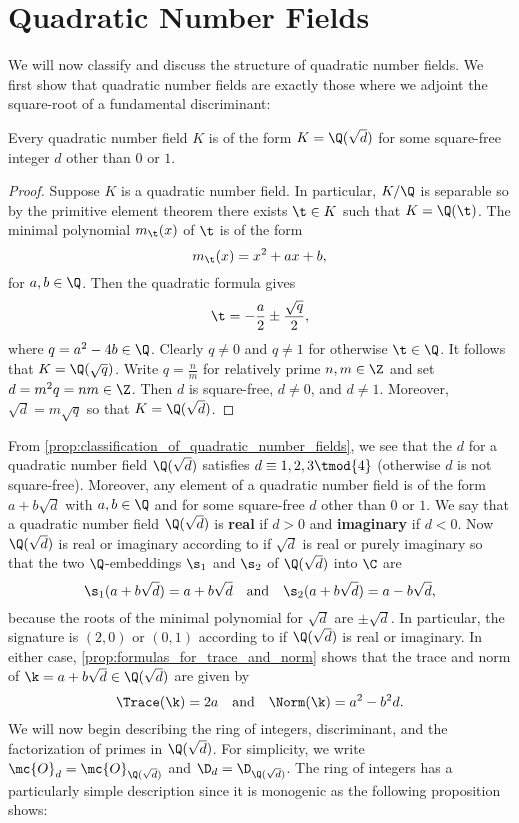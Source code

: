   \section{Quadratic Number Fields}
    We will now classify and discuss the structure of quadratic number fields. We first show that quadratic number fields are exactly those where we adjoint the square-root of a fundamental discriminant:

    \begin{proposition}\label{prop:classification_of_quadratic_number_fields}
      Every quadratic number field $K$ is of the form $K = \Q(\sqrt{d})$ for some square-free integer $d$ other than $0$ or $1$.
    \end{proposition}
    \begin{proof}
      Suppose $K$ is a quadratic number field. In particular, $K/\Q$ is separable so by the primitive element theorem there exists $\t \in K$ such that $K = \Q(\t)$. The minimal polynomial $m_{\t}(x)$ of $\t$ is of the form
      \[
        m_{\t}(x) = x^{2}+ax+b,
      \]
      for $a,b \in \Q$. Then the quadratic formula gives
      \[
        \t = -\frac{a}{2}\pm\frac{\sqrt{q}}{2},
      \]
      where $q = a^{2}-4b \in \Q$. Clearly $q \neq 0$ and $q \neq 1$ for otherwise $\t \in \Q$. It follows that $K = \Q(\sqrt{q})$. Write $q = \frac{n}{m}$ for relatively prime $n,m \in \Z$ and set $d = m^{2}q = nm \in \Z$. Then $d$ is square-free, $d \neq 0$, and $d \neq 1$. Moreover, $\sqrt{d} = m\sqrt{q}$ so that $K = \Q(\sqrt{d})$. 
    \end{proof}

    From \cref{prop:classification_of_quadratic_number_fields}, we see that the $d$ for a quadratic number field $\Q(\sqrt{d})$ satisfies $d \equiv 1,2,3 \tmod{4}$ (otherwise $d$ is not square-free). Moreover, any element of a quadratic number field is of the form $a+b\sqrt{d}$ with $a,b \in \Q$ and for some square-free $d$ other than $0$ or $1$. We say that a quadratic number field $\Q(\sqrt{d})$ is \textbf{real} if $d > 0$ and \textbf{imaginary} if $d < 0$. Now $\Q(\sqrt{d})$ is real or imaginary according to if $\sqrt{d}$ is real or purely imaginary so that the two $\Q$-embeddings $\s_{1}$ and $\s_{2}$ of $\Q(\sqrt{d})$ into $\C$ are
    \[
      \s_{1}(a+b\sqrt{d}) = a+b\sqrt{d} \quad \text{and} \quad \s_{2}(a+b\sqrt{d}) = a-b\sqrt{d},
    \]
    because the roots of the minimal polynomial for $\sqrt{d}$ are $\pm\sqrt{d}$. In particular, the signature is $(2,0)$ or $(0,1)$ according to if $\Q(\sqrt{d})$ is real or imaginary. In either case, \cref{prop:formulas_for_trace_and_norm} shows that the trace and norm of $\k = a+b\sqrt{d} \in \Q(\sqrt{d})$ are given by
    \[
      \Trace(\k) = 2a \quad \text{and} \quad \Norm(\k) = a^{2}-b^{2}d.
    \]
    We will now begin describing the ring of integers, discriminant, and the factorization of primes in $\Q(\sqrt{d})$. For simplicity, we write $\mc{O}_{d} = \mc{O}_{\Q(\sqrt{d})}$ and $\D_{d} = \D_{\Q(\sqrt{d})}$. The ring of integers has a particularly simple description since it is monogenic as the following proposition shows:
    
